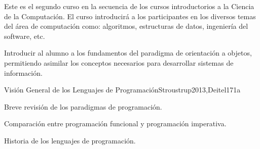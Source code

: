 \begin{syllabus}


\begin{justification}
Este es el segundo curso en la secuencia de los cursos introductorios a la Ciencia de la Computación.
El curso introducirá a los participantes en los diversos temas del área de computación como: algoritmos, estructuras de datos, ingeniería del software, etc.
\end{justification}

\begin{goals}
\item Introducir al alumno a los fundamentos del paradigma de orientación a objetos, permitiendo asimilar los conceptos necesarios para desarrollar sistemas de información.
\end{goals}



\begin{unit}{Visión General de los Lenguajes de Programación}{}{Stroustrup2013,Deitel17}{1}{a}
    \begin{topics}
        \item Breve revisión de los paradigmas de programación.
        \item Comparación entre programación funcional y programación imperativa.
        \item Historia de los lenguajes de programación.
    \end{topics}
    \begin{learningoutcomes}
        \item \SPHistoryLODiscussTheForLanguage [\Familiarity]
    \end{learningoutcomes}
\end{unit}


\end{syllabus}
